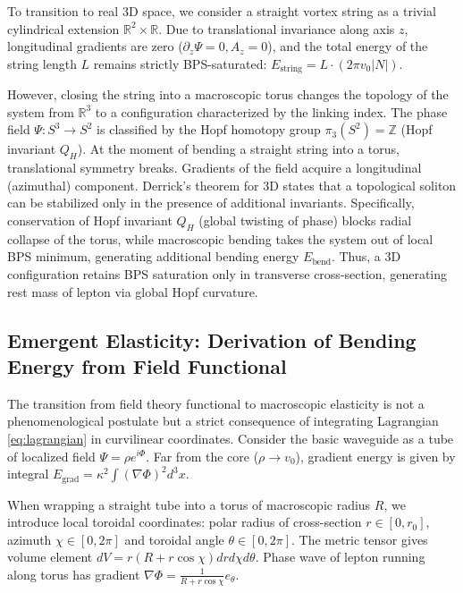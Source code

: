 \documentclass[12pt,a4paper]{article}
\begin{document}
To transition to real 3D space, we consider a straight vortex string as a trivial cylindrical extension $\mathbb{R}^2 \times \mathbb{R}$. Due to translational invariance along axis $z$, longitudinal gradients are zero ($\partial_z\Psi=0, A_z=0$), and the total energy of the string length $L$ remains strictly BPS-saturated: $E_{\text{string}} = L \cdot (2\pi v_0 |N|)$.

However, closing the string into a macroscopic torus changes the topology of the system from $\mathbb{R}^3$ to a configuration characterized by the linking index. The phase field $\Psi: S^3 \to S^2$ is classified by the Hopf homotopy group $\pi_3(S^2)=\mathbb{Z}$ (Hopf invariant $Q_H$). At the moment of bending a straight string into a torus, translational symmetry breaks. Gradients of the field acquire a longitudinal (azimuthal) component. Derrick's theorem for 3D states that a topological soliton can be stabilized only in the presence of additional invariants. Specifically, conservation of Hopf invariant $Q_H$ (global twisting of phase) blocks radial collapse of the torus, while macroscopic bending takes the system out of local BPS minimum, generating additional bending energy $E_{\text{bend}}$. Thus, a 3D configuration retains BPS saturation only in transverse cross-section, generating rest mass of lepton via global Hopf curvature.

\subsection{Emergent Elasticity: Derivation of Bending Energy from Field Functional}
The transition from field theory functional to macroscopic elasticity is not a phenomenological postulate but a strict consequence of integrating Lagrangian \eqref{eq:lagrangian} in curvilinear coordinates. Consider the basic waveguide as a tube of localized field $\Psi = \rho e^{i\Phi}$. Far from the core ($\rho \to v_0$), gradient energy is given by integral $E_{\text{grad}} = \kappa^2 \int (\nabla\Phi)^2 d^3x$.

When wrapping a straight tube into a torus of macroscopic radius $R$, we introduce local toroidal coordinates: polar radius of cross-section $r \in [0,r_0]$, azimuth $\chi \in [0, 2\pi]$ and toroidal angle $\theta \in [0, 2\pi]$. The metric tensor gives volume element $dV = r(R+r\cos\chi)dr d\chi d\theta$. Phase wave of lepton running along torus has gradient $\nabla\Phi = \frac{1}{R+r\cos\chi} e_\theta$.
\end{document}
